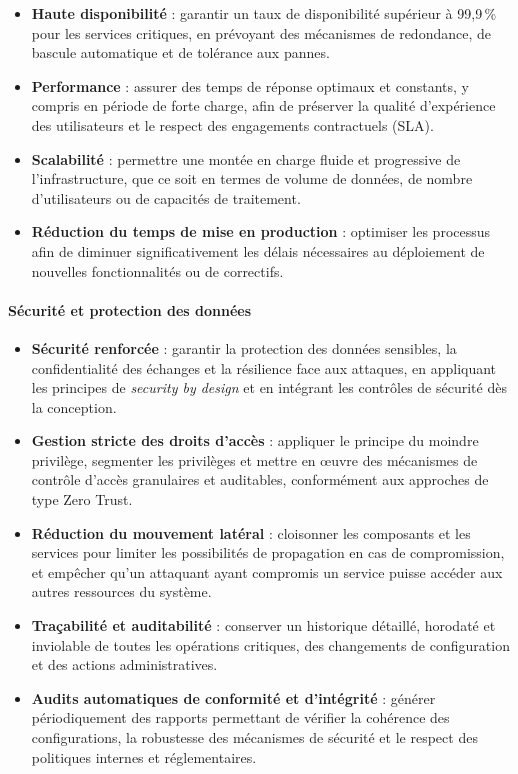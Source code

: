 \begin{itemize}
	\item \textbf{Haute disponibilité} : garantir un taux de disponibilité supérieur à 99,9\,\% pour les services critiques, en prévoyant des mécanismes de redondance, de bascule automatique et de tolérance aux pannes.
	\item \textbf{Performance} : assurer des temps de réponse optimaux et constants, y compris en période de forte charge, afin de préserver la qualité d'expérience des utilisateurs et le respect des engagements contractuels (SLA).
	\item \textbf{Scalabilité} : permettre une montée en charge fluide et progressive de l'infrastructure, que ce soit en termes de volume de données, de nombre d'utilisateurs ou de capacités de traitement.
	\item \textbf{Réduction du temps de mise en production} : optimiser les processus afin de diminuer significativement les délais nécessaires au déploiement de nouvelles fonctionnalités ou de correctifs.
\end{itemize}

\paragraph{\textbf{Sécurité et protection des données}}

\begin{itemize}
	\item \textbf{Sécurité renforcée} : garantir la protection des données sensibles, la confidentialité des échanges et la résilience face aux attaques, en appliquant les principes de \emph{security by design} et en intégrant les contrôles de sécurité dès la conception.
	\item \textbf{Gestion stricte des droits d'accès} : appliquer le principe du moindre privilège, segmenter les privilèges et mettre en œuvre des mécanismes de contrôle d'accès granulaires et auditables, conformément aux approches de type Zero Trust.
	\item \textbf{Réduction du mouvement latéral} : cloisonner les composants et les services pour limiter les possibilités de propagation en cas de compromission, et empêcher qu’un attaquant ayant compromis un service puisse accéder aux autres ressources du système.
	\item \textbf{Traçabilité et auditabilité} : conserver un historique détaillé, horodaté et inviolable de toutes les opérations critiques, des changements de configuration et des actions administratives.
	\item \textbf{Audits automatiques de conformité et d'intégrité} : générer périodiquement des rapports permettant de vérifier la cohérence des configurations, la robustesse des mécanismes de sécurité et le respect des politiques internes et réglementaires.
\end{itemize}


